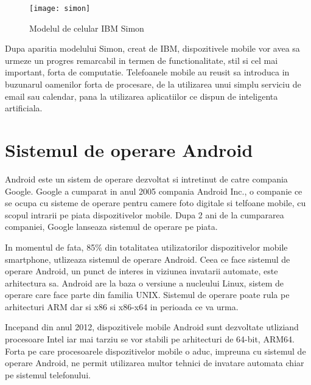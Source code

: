 	
	
		\begin{figure}[H]
		\texttt{[image: simon]}  
		\caption{\label{fig:simon} Modelul de celular IBM Simon
			\protect
			\footnotemark}
	\end{figure}
	
	
	Dupa aparitia modelului Simon, creat de IBM, dispozitivele mobile vor avea sa urmeze un progres remarcabil in termen de functionalitate, stil si cel mai important, forta de computatie. 
	Telefoanele mobile au reusit sa introduca in buzunarul oamenilor forta de procesare, de la utilizarea unui simplu serviciu de email sau calendar, pana la utilizarea aplicatiilor ce dispun de inteligenta artificiala. \cite{history_cellphones}
	
	\vfill
	\newpage
	\section{Sistemul de operare Android}
	Android este un sistem de operare dezvoltat si intretinut de catre compania Google. Google a cumparat in anul 2005 compania Android Inc., o companie ce se ocupa cu sisteme de operare pentru camere foto digitale si telfoane mobile, cu scopul intrarii pe piata dispozitivelor mobile. Dupa 2 ani de la cumpararea companiei, Google lanseaza sistemul de operare pe piata. 
	
	In momentul de fata, 85\% din totalitatea utilizatorilor dispozitivelor mobile smartphone, utlizeaza sistemul de operare Android. 
	Ceea ce face sistemul de operare Android, un punct de interes in viziunea invatarii automate, este arhitectura sa. Android are la baza o versiune a nucleului Linux, sistem de operare care face parte din familia UNIX. Sistemul de operare poate rula pe arhitecturi ARM dar si x86 si x86-x64 in perioada ce va urma. 
	
	Incepand din anul 2012, dispozitivele mobile Android sunt dezvoltate utliziand procesoare Intel iar mai tarziu se vor stabili pe arhitecturi de 64-bit, ARM64. 
	Forta pe care procesoarele dispozitivelor mobile o aduc, impreuna cu sistemul de operare Android, ne permit utilizarea multor tehnici de invatare automata chiar pe sistemul telefonului. 
	
	

